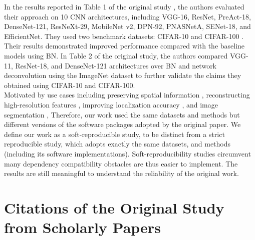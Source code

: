 In the results reported in Table 1 of the original study \cite{ye2020network}, the authors evaluated their approach on 10 CNN architectures, including VGG-16, ResNet, PreAct-18, DenseNet-121, ResNeXt-29, MobileNet v2, DPN-92, PNASNetA, SENet-18, and EfficientNet. They used two benchmark datasets: CIFAR-10 \cite{cifar10} and CIFAR-100 \cite{cifar100}. Their results demonstrated improved performance compared with the baseline models using BN. In Table 2 of the original study, the authors compared VGG-11, ResNet-18, and DenseNet-121 architectures over BN and network deconvolution using the ImageNet \cite{deng2009imagenet} dataset to further validate the claims they obtained using CIFAR-10 and CIFAR-100.\\ 

Motivated by use cases including preserving spatial information \cite{spatial-information-preservation-cao2020sipmask}, reconstructing high-resolution features \cite{passarella2022-reconstructing}, improving localization accuracy \cite{localization-accuracy-gidaris2016locnet}, and image segmentation \cite{Image-segmentation-minaee2021image},  Therefore, our work used the same datasets and methods but different versions of the software packages adopted by the original paper. We define our work as a soft-reproducible study, to be distinct from a strict reproducible study, which adopts exactly the same datasets, and methods (including its software implementations). Soft-reproducibility studies circumvent many dependency compatibility obstacles are thus easier to implement. The results are still meaningful to understand the reliability of the original work. 


\section{Citations of the Original Study from Scholarly Papers}

